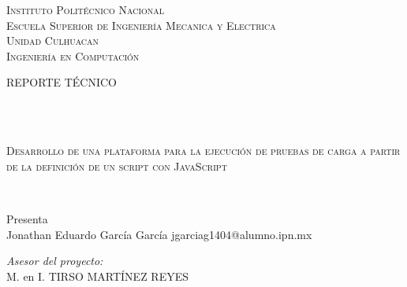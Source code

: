 \begin{center}
\vspace*{-1cm}			%

\textsc{\huge Instituto Polit\'ecnico Nacional}\\[1cm] 
\textsc{\LARGE Escuela Superior de Ingenier\'ia Mecanica y Electrica}\\[0.5cm] %
\textsc{\LARGE Unidad Culhuacan}\\[0.5cm] %
\textsc{\LARGE Ingenier\'ia en Computaci\'on }\\[1cm] %

\begin{minipage}{0.9\textwidth} 
\begin{center}																					%
\textsc{\LARGE REPORTE TÉCNICO}
\end{center}
\end{minipage}\\[0.5cm]
 			\vspace*{1cm}															%
\HRule \\[0.1cm]																	%
\begin{center} \textsc{\Large Desarrollo de una plataforma para la ejecución de pruebas de carga a partir de la definición de un script con JavaScript \\}
\end{center}
\HRule \\[0.1cm]%




   \vspace{0.8cm}
\begin{center}
{\large Presenta}\\                                                                %
Jonathan Eduardo García García\hspace{1cm} jgarciag1404@alumno.ipn.mx
\vspace{1 cm}
\end{center}

\begin{center}
\begin{minipage}{1\textwidth}													    %
\begin{flushleft} \large														    %
\emph{Asesor del proyecto:}\\
\vspace{0.3cm}
M. en I. TIRSO MARTÍNEZ REYES\\
    \vspace*{1cm}	
\end{flushleft}	
\end{minipage}		                                            %
\end{center}


\end{center}
